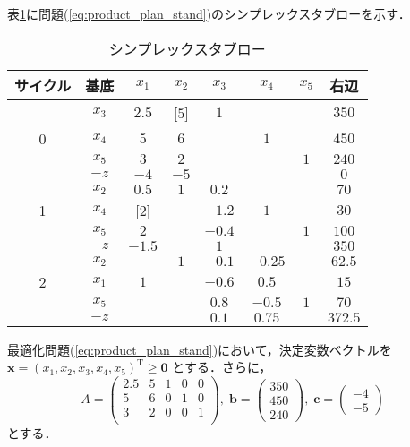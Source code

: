 \documentclass{jsreport}
\begin{document}
表\ref{tab:product_plan_sol}に問題(\ref{eq:product_plan_stand})のシンプレックスタブローを示す．
\begin{table}[htb]
  \centering
    \caption{シンプレックスタブロー}
    \begin{tabular}{c|c|ccccc|c}
    サイクル & 基底   & $x_1$ & $x_2$ & $x_3$ & $x_4$ & $x_5$ & 右辺  \\ \hline
            & $x_3$ & $2.5$ & [$5$] & $1$   &       &       & $350$ \\
       0    & $x_4$ & $5$   & $6$   &       & $1$   &       & $450$ \\
            & $x_5$ & $3$   & $2$   &       &       &  $1$  & $240$ \\ \cline{2-8}
            & $-z$  & $-4$  & $-5$  &       &       &       & $0$   \\ \hline

            & $x_2$ & $0.5$ & $1$   & $0.2$ &       &       & $70$  \\
       1    & $x_4$ & [$2$] &       & $-1.2$& $1$   &       & $30$  \\
            & $x_5$ & $2$   &       & $-0.4$&       &  $1$  & $100$ \\ \cline{2-8}
            & $-z$  & $-1.5$&       & $1$   &       &       & $350$ \\ \hline

            & $x_2$ &       & $1$   & $-0.1$&$-0.25$&       & $62.5$\\
       2    & $x_1$ & $1$   &       & $-0.6$& $0.5$ &       & $15$  \\
            & $x_5$ &       &       & $0.8$ &$-0.5$ &  $1$  & $70$  \\ \cline{2-8}
            & $-z$  &       &       & $0.1$ & $0.75$&       &$372.5$\\ \hline
    \end{tabular}
    \label{tab:product_plan_sol}
\end{table}

最適化問題(\ref{eq:product_plan_stand})において，決定変数ベクトルを$\bm{x} = (x_1, x_2, x_3, x_4, x_5)^{\mathrm{T}} \geq \bm{0}$
とする．さらに，
\begin{equation}
  A = \left(
  \begin{array}{ccccc}
    2.5 & 5 & 1 & 0 & 0 \\
    5   & 6 & 0 & 1 & 0 \\
    3   & 2 & 0 & 0 & 1 \\
  \end{array}
  \right), \; \bm{b} = \left(
  \begin{array}{c}
    350 \\
    450 \\
    240
  \end{array}
  \right), \; \bm{c} = \left(
  \begin{array}{c}
    -4 \\
    -5
  \end{array}
  \right) \nonumber
\end{equation}
とする．
\end{document}
